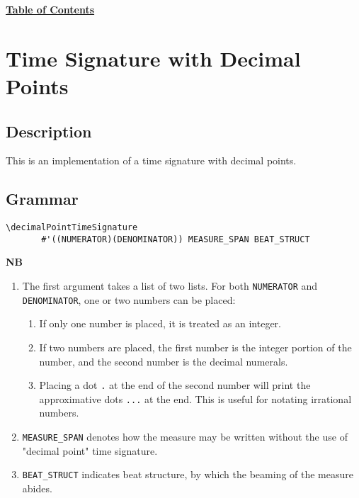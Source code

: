 \hyperref[sec:toc]{\textbf{Table of Contents}}

\vfill \break





\section {Time Signature with Decimal Points}

\hfill
{}
\hfill

\subsection{Description}
This is an implementation of a time signature with decimal points. 
\subsection{Grammar}
\begin{verbatim}
\decimalPointTimeSignature
       #'((NUMERATOR)(DENOMINATOR)) MEASURE_SPAN BEAT_STRUCT
\end{verbatim}
\textbf{NB}
\begin{enumerate}
\item The first argument takes a list of two lists. For both \verb|NUMERATOR| and \verb|DENOMINATOR|, one or two numbers can be placed:
\begin{enumerate}
\item If only one number is placed, it is treated as an integer.
\item If two numbers are placed, the first number is the integer portion of the number, and the second number is the decimal numerals.
\item Placing a dot \verb|.| at the end of the second number will print the approximative dots \verb|...| at the end. This is useful for notating irrational numbers. 
\end{enumerate}
\item \verb|MEASURE_SPAN| denotes how the measure may be written without the use of "decimal point" time signature. 
\item \verb |BEAT_STRUCT| indicates beat structure, by which the beaming of the measure abides.

\end{enumerate}


